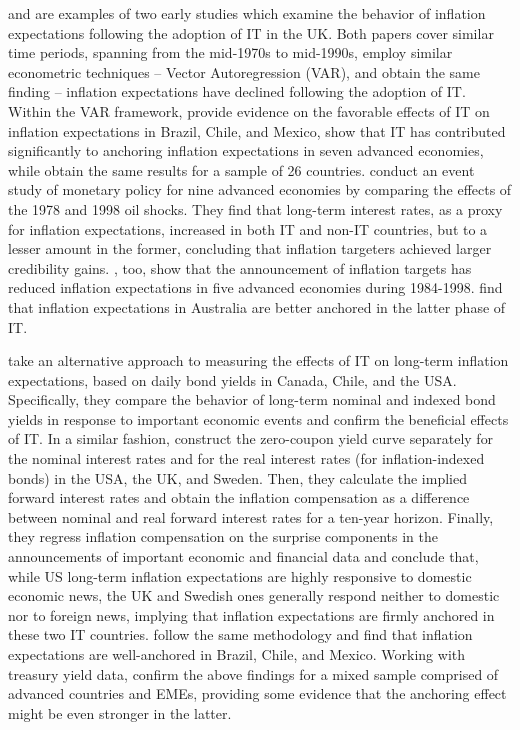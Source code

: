 \documentclass{article}
\begin{document}
\citet{huh1996} and \citet{lane1998} are examples of two early studies which examine the behavior of inflation expectations following the adoption of IT in the UK. Both papers cover similar time periods, spanning from the mid-1970s to mid-1990s, employ similar econometric techniques – Vector Autoregression (VAR), and obtain the same finding – inflation expectations have declined following the adoption of IT. Within the VAR framework, \citet{schmidt-hebbel2002} provide evidence on the favorable effects of IT on inflation expectations in Brazil, Chile, and Mexico, \citet{demertzis2010} show that IT has contributed significantly to anchoring inflation expectations in seven advanced economies, while \citet{corbo2001} obtain the same results for a sample of 26 countries. \citet{neumann2002} conduct an event study of monetary policy for nine advanced economies by comparing the effects of the 1978 and 1998 oil shocks. They find that long-term interest rates, as a proxy for inflation expectations, increased in both IT and non-IT countries, but to a lesser amount in the former, concluding that inflation targeters achieved larger credibility gains. \citet{johnson2003}, too, show that the announcement of inflation targets has reduced inflation expectations in five advanced economies during 1984-1998. \citet{gillitzer2015} find that inflation expectations in Australia are better anchored in the latter phase of IT.

\citet{gurkaynak2007} take an alternative approach to measuring the effects of IT on long-term inflation expectations, based on daily bond yields in Canada, Chile, and the USA. Specifically, they compare the behavior of long-term nominal and indexed bond yields in response to important economic events and confirm the beneficial effects of IT. In a similar fashion, \citet{gurkaynak2010} construct the zero-coupon yield curve separately for the nominal interest rates and for the real interest rates (for inflation-indexed bonds) in the USA, the UK, and Sweden. Then, they calculate the implied forward interest rates and obtain the inflation compensation as a difference between nominal and real forward interest rates for a ten-year horizon. Finally, they regress inflation compensation on the surprise components in the announcements of important economic and financial data and conclude that, while US long-term inflation expectations are highly responsive to domestic economic news, the UK and Swedish ones generally respond neither to domestic nor to foreign news, implying that inflation expectations are firmly anchored in these two IT countries. \citet{depooter2014} follow the same methodology and find that inflation expectations are well-anchored in Brazil, Chile, and Mexico. Working with treasury yield data, \citet{suh2021} confirm the above findings for a mixed sample comprised of advanced countries and EMEs, providing some evidence that the anchoring effect might be even stronger in the latter.
\end{document}

